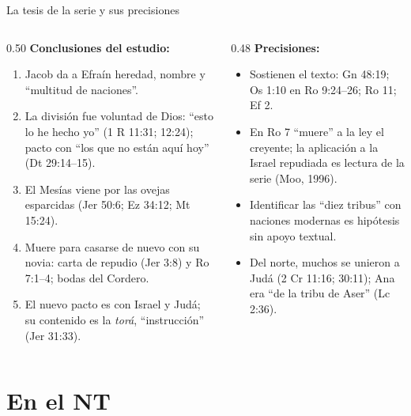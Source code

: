 \documentclass[hyperref={bookmarks=false},aspectratio=169]{beamer}
\newcommand{\destacar}[1]{\textbf{\textcolor{tierraroja}{#1}}}
\begin{document}
\begin{frame}{La tesis de la serie y sus precisiones}
\begin{columns}[t,onlytextwidth]
\begin{column}{0.50\textwidth}\scriptsize
\destacar{Conclusiones del estudio:}
\begin{enumerate}
\item Jacob da a Efraín heredad, nombre y ``multitud de naciones''.
\item La división fue voluntad de Dios: ``esto lo he hecho yo'' (1 R 11:31; 12:24); pacto con ``los que no están aquí hoy'' (Dt 29:14--15).
\item El Mesías viene por las ovejas esparcidas (Jer 50:6; Ez 34:12; Mt 15:24).
\item Muere para casarse de nuevo con su novia: carta de repudio (Jer 3:8) y Ro 7:1--4; bodas del Cordero.
\item El nuevo pacto es con Israel y Judá; su contenido es la \emph{torá}, ``instrucción'' (Jer 31:33).
\end{enumerate}
\end{column}
\begin{column}{0.48\textwidth}\scriptsize
\destacar{Precisiones:}
\begin{itemize}
\item Sostienen el texto: Gn 48:19; Os 1:10 en Ro 9:24--26; Ro 11; Ef 2.
\item En Ro 7 ``muere'' a la ley el creyente; la aplicación a la Israel repudiada es lectura de la serie (Moo, 1996).
\item Identificar las ``diez tribus'' con naciones modernas es hipótesis sin apoyo textual.
\item Del norte, muchos se unieron a Judá (2 Cr 11:16; 30:11); Ana era ``de la tribu de Aser'' (Lc 2:36).
\end{itemize}
\end{column}
\end{columns}
\end{frame}

\section{En el NT}
\end{document}
